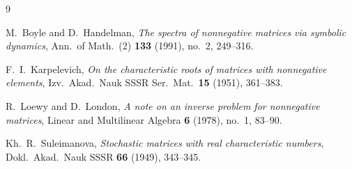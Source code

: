 \documentclass[11pt]{article}
\theoremstyle{definition}
\theoremstyle{remark}
\begin{document}
\begin{thebibliography}{9}

M.~Boyle and D.~Handelman,
\emph{The spectra of nonnegative matrices via symbolic dynamics},
Ann.\ of Math.\ (2) \textbf{133} (1991), no.~2, 249--316.

F.~I.~Karpelevich,
\emph{On the characteristic roots of matrices with nonnegative elements},
Izv.\ Akad.\ Nauk SSSR Ser.\ Mat.\ \textbf{15} (1951), 361--383.

R.~Loewy and D.~London,
\emph{A note on an inverse problem for nonnegative matrices},
Linear and Multilinear Algebra \textbf{6} (1978), no.~1, 83--90.

Kh.~R.~Suleimanova,
\emph{Stochastic matrices with real characteristic numbers},
Dokl.\ Akad.\ Nauk SSSR \textbf{66} (1949), 343--345.

\end{thebibliography}
\end{document}
